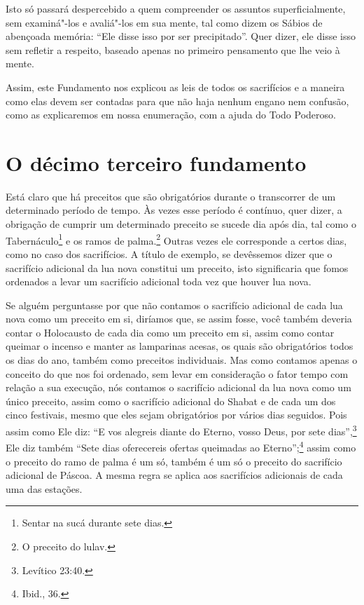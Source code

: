 Isto só passará despercebido a quem compreender os assuntos
superficialmente, sem examiná"-los e avaliá"-los em sua mente, tal como
dizem os Sábios de abençoada memória: ``Ele disse isso por ser
precipitado''. Quer dizer, ele disse isso sem refletir a respeito,
baseado apenas no primeiro pensamento que lhe veio à mente.

Assim, este Fundamento nos explicou as leis de todos os sacrifícios e a
maneira como elas devem ser contadas para que não haja nenhum engano nem
confusão, como as explicaremos em nossa enumeração, com a ajuda do Todo
Poderoso.

\chapter*{O décimo terceiro fundamento}

Está claro que há preceitos que são obrigatórios durante o transcorrer
de um determinado período de tempo. Às vezes esse período é contínuo,
quer dizer, a obrigação de cumprir um determinado preceito se sucede dia
após dia, tal como o Tabernáculo\footnote{Sentar na sucá\starr{} durante sete dias.} e os ramos de
palma.\footnote{O preceito do lulav\starr.} Outras vezes ele corresponde a certos dias,
como no caso dos sacrifícios. A título de exemplo, se devêssemos dizer
que o sacrifício adicional da lua nova constitui um preceito, isto
significaria que fomos ordenados a levar um sacrifício adicional toda
vez que houver lua nova.

Se alguém perguntasse por que não contamos o sacrifício adicional de
cada lua nova como um preceito em si, diríamos que, se assim fosse, você
também deveria contar o Holocausto de cada dia como um preceito em si,
assim como contar queimar o incenso e manter as lamparinas acesas, os
quais são obrigatórios todos os dias do ano, também como preceitos
individuais. Mas como contamos apenas o conceito do que nos foi
ordenado, sem levar em consideração o fator tempo com relação a sua
execução, nós contamos o sacrifício adicional da lua nova como um único
preceito, assim como o sacrifício adicional do Shabat e de cada um dos
cinco festivais, mesmo que eles sejam obrigatórios por vários dias
seguidos. Pois assim como Ele diz: ``E vos alegreis diante do Eterno,
vosso Deus, por sete dias'',\footnote{Levítico 23:40.} Ele diz também ``Sete dias
oferecereis ofertas queimadas ao Eterno'';\footnote{Ibid., 36.} assim como o
preceito do ramo de palma é um só, também é um só o preceito do
sacrifício adicional de Páscoa. A mesma regra se aplica aos sacrifícios
adicionais de cada uma das estações.

